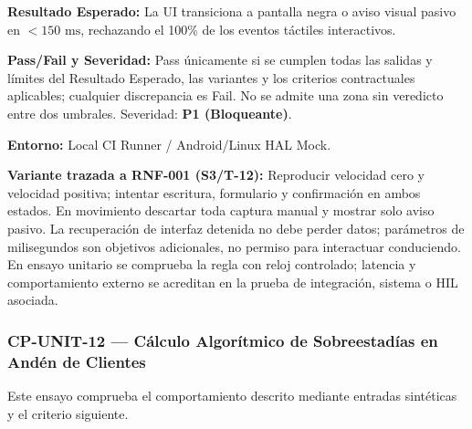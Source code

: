 \par\noindent\textbf{Resultado Esperado:} La UI transiciona a pantalla negra o aviso visual pasivo en \(< 150\text{ ms}\), rechazando el 100\% de los eventos táctiles interactivos.\par
\par\noindent\textbf{Pass/Fail y Severidad:} Pass únicamente si se cumplen todas las salidas y límites del Resultado Esperado, las variantes y los criterios contractuales aplicables; cualquier discrepancia es Fail. No se admite una zona sin veredicto entre dos umbrales. Severidad: \textbf{P1 (Bloqueante)}.\par
\par\noindent\textbf{Entorno:} Local CI Runner / Android/Linux HAL Mock.\par







\par\noindent\textbf{Variante trazada a RNF-001 (S3/T-12):} Reproducir velocidad cero y velocidad positiva; intentar escritura, formulario y confirmación en ambos estados. En movimiento descartar toda captura manual y mostrar solo aviso pasivo. La recuperación de interfaz detenida no debe perder datos; parámetros de milisegundos son objetivos adicionales, no permiso para interactuar conduciendo. En ensayo unitario se comprueba la regla con reloj controlado; latencia y comportamiento externo se acreditan en la prueba de integración, sistema o HIL asociada.\par
\subsubsection*{CP-UNIT-12 — Cálculo Algorítmico de Sobreestadías en Andén de Clientes}\label{sec:9-cp-unit-12}
Este ensayo comprueba el comportamiento descrito mediante entradas sintéticas y el criterio siguiente.

